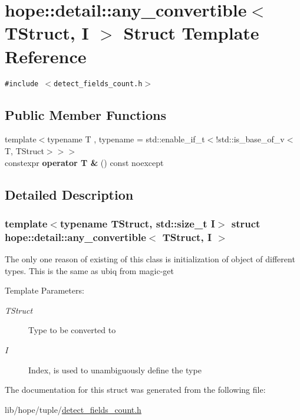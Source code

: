 \hypertarget{structhope_1_1detail_1_1any__convertible}{
\section{hope::detail::any\_\-convertible$<$ TStruct, I $>$ Struct Template Reference}
\label{structhope_1_1detail_1_1any__convertible}
}
{\tt \#include $<$detect\_\-fields\_\-count.h$>$}

\subsection*{Public Member Functions}
\begin{CompactItemize}
\item 
\hypertarget{structhope_1_1detail_1_1any__convertible_54b3deb82f30f927d87ed6184bd54f59}{
{\footnotesize template$<$typename T , typename  = std::enable\_\-if\_\-t$<$!std::is\_\-base\_\-of\_\-v$<$T, TStruct$>$$>$$>$ }\\constexpr \textbf{operator T \&} () const noexcept}
\label{structhope_1_1detail_1_1any__convertible_54b3deb82f30f927d87ed6184bd54f59}

\end{CompactItemize}


\subsection{Detailed Description}
\subsubsection*{template$<$typename TStruct, std::size\_\-t I$>$ struct hope::detail::any\_\-convertible$<$ TStruct, I $>$}

The only one reason of existing of this class is initialization of object of different types. This is the same as ubiq from magic-get \begin{Desc}
\item[Template Parameters:]
\begin{description}
\item[{\em TStruct}]Type to be converted to \item[{\em I}]Index, is used to unambiguously define the type \end{description}
\end{Desc}


The documentation for this struct was generated from the following file:\begin{CompactItemize}
\item 
lib/hope/tuple/\hyperlink{detect__fields__count_8h}{detect\_\-fields\_\-count.h}\end{CompactItemize}
